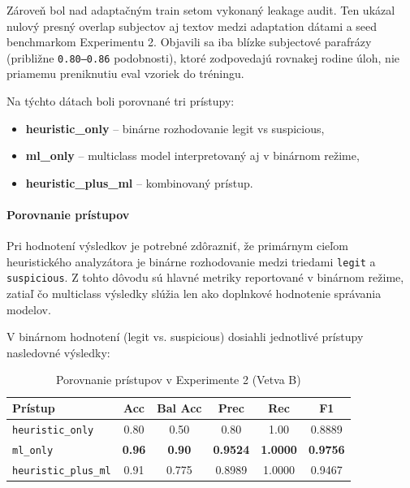 \documentclass[conference]{IEEEtran}
\begin{document}
Zároveň bol nad adaptačným train setom vykonaný leakage audit. Ten ukázal nulový presný overlap subjectov aj textov medzi adaptation dátami a seed benchmarkom Experimentu 2. Objavili sa iba blízke subjectové parafrázy (približne \texttt{0.80--0.86} podobnosti), ktoré zodpovedajú rovnakej rodine úloh, nie priamemu preniknutiu eval vzoriek do tréningu.

Na týchto dátach boli porovnané tri prístupy:

\begin{itemize}
    \item \textbf{heuristic\_only} – binárne rozhodovanie legit vs suspicious,
    \item \textbf{ml\_only} – multiclass model interpretovaný aj v binárnom režime,
    \item \textbf{heuristic\_plus\_ml} – kombinovaný prístup.
\end{itemize}

\paragraph{Porovnanie prístupov}

Pri hodnotení výsledkov je potrebné zdôrazniť, že primárnym cieľom heuristického analyzátora je binárne rozhodovanie medzi triedami \texttt{legit} a \texttt{suspicious}. Z tohto dôvodu sú hlavné metriky reportované v binárnom režime, zatiaľ čo multiclass výsledky slúžia len ako doplnkové hodnotenie správania modelov.

V binárnom hodnotení (legit vs. suspicious) dosiahli jednotlivé prístupy nasledovné výsledky:

\begin{table}[H]
\centering
\caption{Porovnanie prístupov v Experimente 2 (Vetva B)}
\label{tab:exp2_comparison}
\footnotesize
\setlength{\tabcolsep}{4pt}
\renewcommand{\arraystretch}{1.1}
\begin{tabular}{lccccc}
\toprule
\textbf{Prístup} & \textbf{Acc} & \textbf{Bal Acc} & \textbf{Prec} & \textbf{Rec} & \textbf{F1} \\
\midrule
\texttt{heuristic\_only}        & 0.80 & 0.50  & 0.80   & 1.00 & 0.8889 \\
\texttt{ml\_only}               & \textbf{0.96} & \textbf{0.90} & \textbf{0.9524} & \textbf{1.0000} & \textbf{0.9756} \\
\texttt{heuristic\_plus\_ml}    & 0.91 & 0.775 & 0.8989 & 1.0000 & 0.9467 \\
\bottomrule
\end{tabular}
\end{table}
\end{document}
